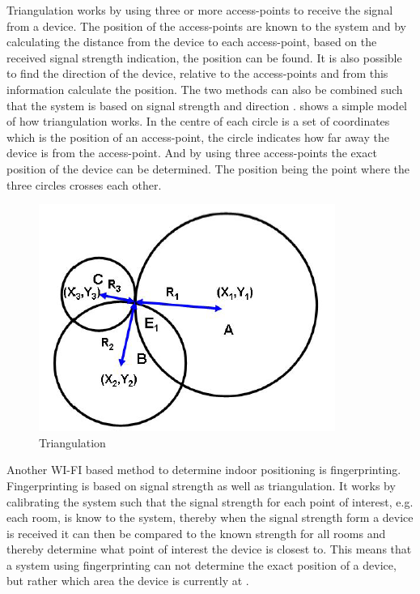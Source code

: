 Triangulation works by using three or more access-points to receive the signal from a device. The position of the access-points are known to the system and by calculating the distance from the device to each access-point, based on the received signal strength indication, the position can be found. It is also possible to find the direction of the device, relative to the access-points and from this information calculate the position. The two methods can also be combined such that the system is based on signal strength and direction \cite{Triangulation}.
 shows a simple model of how triangulation works. In the centre of each circle is a set of coordinates which is the position of an access-point, the circle indicates how far away the device is from the access-point. And by using three access-points the exact position of the device can be determined. The position being the point where the three circles crosses each other.
\begin{figure}[ht]
	\begin{center}
		\includegraphics[scale=1]{graphics/triangulation.png}
		\caption{Triangulation\cite{Triangualtion}}
		\label{fig:triangulation}
	\end{center}
\end{figure}

Another WI-FI based method to determine indoor positioning is fingerprinting. Fingerprinting is based on signal strength as well as triangulation. It works by calibrating the system such that the signal strength for each point of interest, e.g. each room, is know to the system, thereby when the signal strength form a device is received it can then be compared to the known strength for all rooms and thereby determine what point of interest the device is closest to. This means that a system using fingerprinting can not determine the exact position of a device, but rather which area the device is currently at \cite{fingerprint1}.

